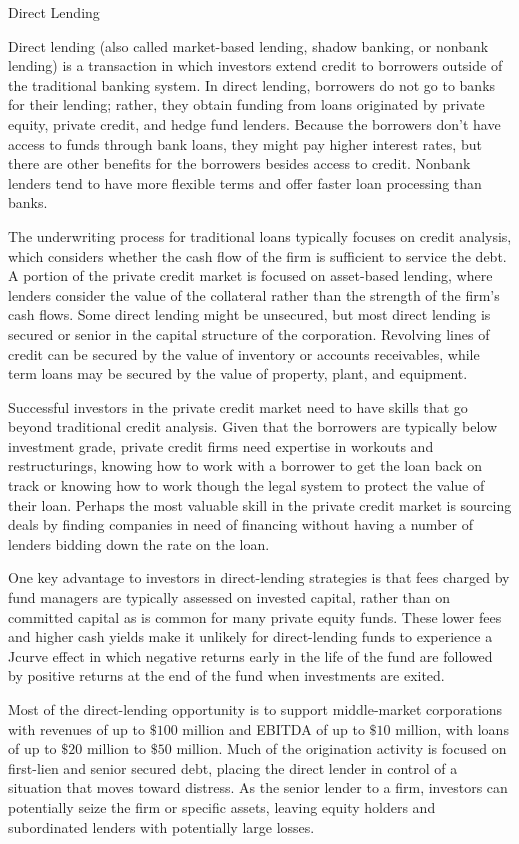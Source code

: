 \documentclass[11pt]{article}
\begin{document}
Direct Lending

Direct lending (also called market-based lending, shadow banking, or nonbank lending) is a transaction in which investors extend credit to borrowers outside of the traditional banking system. In direct lending, borrowers do not go to banks for their lending; rather, they obtain funding from loans originated by private equity, private credit, and hedge fund lenders. Because the borrowers don't have access to funds through bank loans, they might pay higher interest rates, but there are other benefits for the borrowers besides access to credit. Nonbank lenders tend to have more flexible terms and offer faster loan processing than banks.

The underwriting process for traditional loans typically focuses on credit analysis, which considers whether the cash flow of the firm is sufficient to service the debt. A portion of the private credit market is focused on asset-based lending, where lenders consider the value of the collateral rather than the strength of the firm's cash flows. Some direct lending might be unsecured, but most direct lending is secured or senior in the capital structure of the corporation. Revolving lines of credit can be secured by the value of inventory or accounts receivables, while term loans may be secured by the value of property, plant, and equipment.

Successful investors in the private credit market need to have skills that go beyond traditional credit analysis. Given that the borrowers are typically below investment grade, private credit firms need expertise in workouts and restructurings, knowing how to work with a borrower to get the loan back on track or knowing how to work though the legal system to protect the value of their loan. Perhaps the most valuable skill in the private credit market is sourcing deals by finding companies in need of financing without having a number of lenders bidding down the rate on the loan.

One key advantage to investors in direct-lending strategies is that fees charged by fund managers are typically assessed on invested capital, rather than on committed capital as is common for many private equity funds. These lower fees and higher cash yields make it unlikely for direct-lending funds to experience a Jcurve effect in which negative returns early in the life of the fund are followed by positive returns at the end of the fund when investments are exited.

Most of the direct-lending opportunity is to support middle-market corporations with revenues of up to $\$ 100$ million and EBITDA of up to $\$ 10$ million, with loans of up to $\$ 20$ million to $\$ 50$ million. Much of the origination activity is focused on first-lien and senior secured debt, placing the direct lender in control of a situation that moves toward distress. As the senior lender to a firm, investors can potentially seize the firm or specific assets, leaving equity holders and subordinated lenders with potentially large losses.
\end{document}
